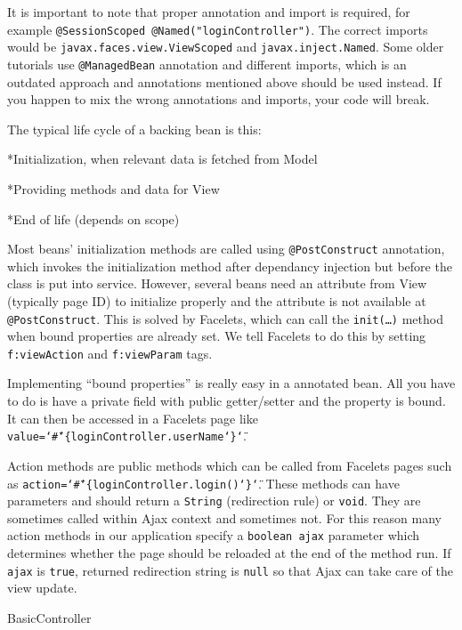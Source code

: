 It is important to note that proper annotation and import is required, for example {\tt @SessionScoped @Named("loginController")}. The correct imports would be {\tt javax.faces.view.ViewScoped} and {\tt javax.inject.Named}. Some older tutorials use {\tt @ManagedBean} annotation and different imports, which is an outdated approach and  annotations mentioned above should be used instead. If you happen to mix the wrong annotations and imports, your code will break.

The typical life cycle of a backing bean is this:

\begitems

*Initialization, when relevant data is fetched from Model

*Providing methods and data for View

*End of life (depends on scope)

\enditems

Most beans’ initialization methods are called using {\tt @PostConstruct} annotation, which invokes the initialization method after dependancy injection but before the class is put into service. However, several beans need an attribute from View (typically page ID) to initialize properly and the attribute is not available at {\tt @PostConstruct}. This is solved by Facelets, which can call the {\tt init(…)} method when bound properties are already set. We tell Facelets to do this by setting {\tt f:viewAction} and {\tt f:viewParam} tags.

Implementing “bound properties” is really easy in a  annotated bean. All you have to do is have a private field with public getter/setter and the property is bound. It can then be accessed in a Facelets page like {\tt value=\char`\"\#\char`\{loginController.userName\char`\}\char`\"}.

Action methods are public methods which can be called from Facelets pages such as {\tt action=\char`\"\#\char`\{loginController.login()\char`\}\char`\"}. These methods can have parameters and should return a {\tt String} (redirection rule) or {\tt void}. They are sometimes called within Ajax context and sometimes not. For this reason many action methods in our application specify a {\tt boolean ajax} parameter which determines whether the page should be reloaded at the end of the method run. If {\tt ajax} is {\tt true}, returned redirection string is {\tt null} so that Ajax can take care of the view update.

\secc BasicController

